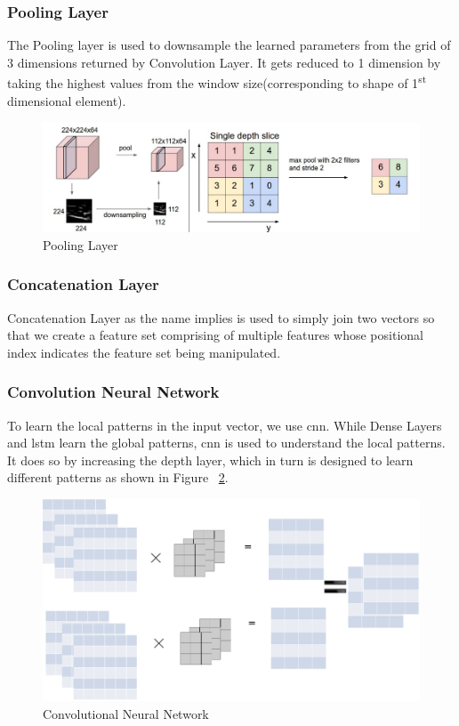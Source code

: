   \subsubsection{Pooling Layer}
  The Pooling layer is used to downsample the learned parameters from the grid of 3 dimensions returned by Convolution Layer. It gets reduced to 1 dimension by taking the highest values from the window size(corresponding to shape of 1\textsuperscript{st} dimensional element).
  \begin{figure}
    [ht]\centering
    \includegraphics[width=.75\linewidth]{mainmatter/3-Methodology/images/pooling.png}
    \caption{Pooling Layer}
    \label{fig:pool_layer}
  \end{figure}
  
  \subsubsection{Concatenation Layer}
  Concatenation Layer as the name implies is used to simply join two vectors so that we create a feature set comprising of multiple features whose positional index indicates the feature set being manipulated.
  
  \subsubsection{Convolution Neural Network}
  To learn the local patterns in the input vector, we use \acrshort{cnn}. While Dense Layers and \acrshort{lstm} learn the global patterns, \acrshort{cnn} is used to understand the local patterns. It does so by increasing the depth layer, which in turn is designed to learn different patterns as shown in Figure ~\ref{fig:cnn}.
  \begin{figure}[ht]
    \centering
    \includegraphics[width=.5\linewidth]{mainmatter/3-Methodology/images/cnn.png}
    \caption{Convolutional Neural Network}
    \label{fig:cnn}
  \end{figure}
  
